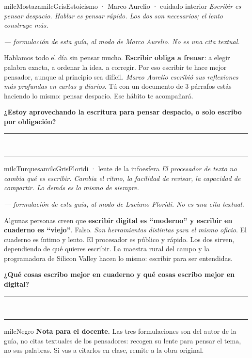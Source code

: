 \documentclass[11pt,letterpaper]{article}
\newcommand{\linead}[1]{\noindent\color{milcLinea}\rule{#1}{0.5pt}\color{milcNegro}}
\begin{document}
\begin{softbox}{milcMostaza}{milcGris}{Estoicismo · Marco Aurelio · cuidado interior}
\textit{Escribir es pensar despacio. Hablar es pensar rápido. Los dos son necesarios; el lento construye más.}

{\footnotesize\itshape\color{milcNegro!70}--- formulación de esta guía, al modo de Marco Aurelio. No es una cita textual.}

Hablamos todo el día sin pensar mucho. \textbf{Escribir obliga a frenar}: a elegir palabra exacta, a ordenar la idea, a corregir. Por eso escribir te hace mejor pensador, aunque al principio sea difícil. \emph{Marco Aurelio escribió sus reflexiones más profundas en cartas y diarios}. Tú con un documento de 3 párrafos estás haciendo lo mismo: pensar despacio. Ese hábito te acompañará.

\textbf{¿Estoy aprovechando la escritura para pensar despacio, o solo escribo por obligación?}
\end{softbox}
\linead{\linewidth}\\[1mm]
\linead{\linewidth}

\begin{softbox}{milcTurquesa}{milcGris}{Floridi · lente de la infoesfera}
\textit{El procesador de texto no cambia qué es escribir. Cambia el ritmo, la facilidad de revisar, la capacidad de compartir. Lo demás es lo mismo de siempre.}

{\footnotesize\itshape\color{milcNegro!70}--- formulación de esta guía, al modo de Luciano Floridi. No es una cita textual.}

Algunas personas creen que \textbf{escribir digital es ``moderno'' y escribir en cuaderno es ``viejo''}. Falso. \emph{Son herramientas distintas para el mismo oficio}. El cuaderno es íntimo y lento. El procesador es público y rápido. Los dos sirven, dependiendo de qué quieres escribir. La maestra rural del campo y la programadora de Silicon Valley hacen lo mismo: escribir para ser entendidas.

\textbf{¿Qué cosas escribo mejor en cuaderno y qué cosas escribo mejor en digital?}
\end{softbox}
\linead{\linewidth}\\[1mm]
\linead{\linewidth}

\begin{infoband}{milcNegro}
\textbf{Nota para el docente.} Las tres formulaciones son del autor de la guía, no citas textuales de los pensadores: recogen su lente para pensar el tema, no sus palabras. Si vas a citarlos en clase, remite a la obra original.
\end{infoband}
\end{document}
